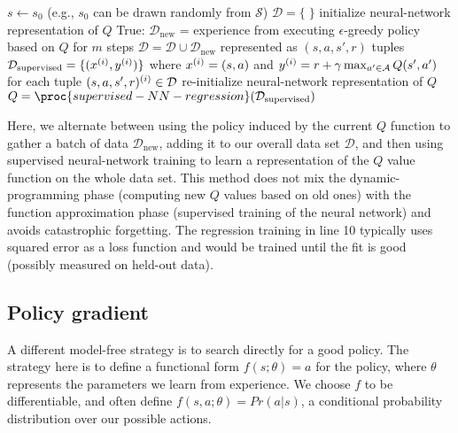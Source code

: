 \begin{codebox}
  \li $s \gets s_0$ \Comment (e.g., $s_0$ can be drawn randomly from $\mathcal{S}$)
  \li $\mathcal{D} = \{\;\}$
  \li initialize neural-network representation of $Q$
  \li \While True: \Do
  \li  $\mathcal{D}_\text{new}$ = experience from executing $\epsilon$-greedy policy based
  on $Q$ for $m$ steps
  \li $\mathcal{D} = \mathcal{D} \cup \mathcal{D}_\text{new}$ represented
  as $(s, a, s', r)$ tuples
  \li $\mathcal{D}_\text{supervised} = \{(x^{(i)}, y^{(i)})\}$  where $x^{(i)} =
    (s, a)$ and $y^{(i)} = r + \gamma \max_{a' \in \mathcal{A}} Q(s', a')$
  \li \;\;\;for each tuple $(s, a, s', r)^{(i)} \in \mathcal{D}$
  \li re-initialize neural-network representation of $Q$
  \li $Q = \proc{supervised-NN-regression}(\mathcal{D}_\text{supervised})$
  \End
\end{codebox}

Here, we alternate between using the policy induced by the current $Q$
function to gather a batch of data $\mathcal{D}_\text{new}$, adding it
to our overall data set $\mathcal{D}$, and then using supervised
neural-network training to learn a representation of the $Q$ value
function on the whole data set.  This method does not mix the
dynamic-programming phase (computing new $Q$ values based on old ones)
with the function approximation phase (supervised training of the
neural network) and avoids catastrophic forgetting.  The regression
training in line 10 typically uses squared error as a loss function and
would be trained until the fit is good (possibly measured on held-out
data).




\subsection{Policy gradient}
\label{sec-rl_policy_search}

A different model-free strategy is to search directly for a good
policy.  The strategy here is to define a functional form $f(s;\theta)
  = a$ for the policy, where $\theta$ represents the parameters we learn
from experience. We choose $f$ to be differentiable, and often define 
$f(s, a;\theta) = Pr(a|s)$, a conditional probability distribution over
our possible actions.

